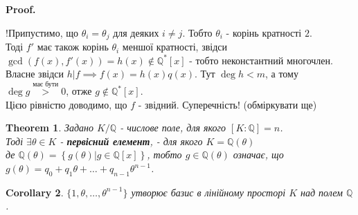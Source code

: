\documentclass[a4paper, 10pt]{article}
\makeatletter
\theoremstyle{theoremdd}
\newtheorem{theorem}{Theorem}[subsection]
\theoremstyle{theoremdd}
\theoremstyle{theoremdd}
\theoremstyle{theoremdd}
\theoremstyle{theoremdd}
\theoremstyle{theoremdd}
\theoremstyle{theoremdd}
\theoremstyle{theoremdd}
\newtheorem{corollary}[theorem]{Corollary}
\renewenvironment{proof}[1][Proof.\\]{\par
\pushQED{\hfill \qed}%
\normalfont \topsep6\p@\@plus6\p@\relax
\trivlist
\item\relax
{\bfseries
#1\@addpunct{.}}\hspace\labelsep\ignorespaces
}{%
\popQED\endtrivlist\@endpefalse
}
\makeatother
\begin{document}
\begin{proof}
!Припустимо, що $\theta_i = \theta_j$ для деяких $i \neq j$. Тобто $\theta_i$ - корінь кратності $2$.\\
Тоді $f'$ має також корінь $\theta_i$ меншої кратності, звідси\\
$\gcd(f(x),f'(x)) = h(x) \not\in \mathbb{Q}^*[x]$ - тобто неконстантний многочлен. Власне звідси $h|f \implies f(x) = h(x)q(x)$. Тут $\deg h < m$, а тому $\deg g \overset{\text{має бути}}{>} 0$, отже $g \not\in \mathbb{Q}^*[x]$.\\
Цією рівністю доводимо, що $f$ - звідний. Суперечність! (обміркувати ще)
\end{proof}

\begin{theorem}
Задано $K/\mathbb{Q}$ - числове поле, для якого $[K:\mathbb{Q}] = n$.\\
Тоді $\exists \theta \in K$ - \textbf{первісний елемент}, - для якого $K = \mathbb{Q}(\theta)$\\
де $\mathbb{Q}(\theta) = \left\{ g(\theta) | g \in \mathbb{Q}[x] \right\}$, тобто $g \in \mathbb{Q}(\theta)$ означає, що \\
$g(\theta) = q_0 + q_1 \theta + \dots + q_{n-1} \theta^{n-1}$.
\end{theorem}

\begin{corollary}
$\{1,\theta,\dots,\theta^{n-1}\}$ утворює базис в лінійному просторі $K$ над полем $\mathbb{Q}$.
\end{corollary}
\end{document}
